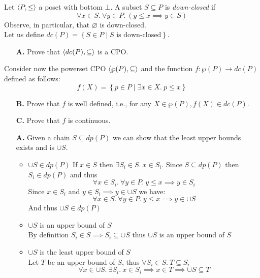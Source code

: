 \begin{exercise}{
    Let $\left< P, \leq \right>$ a poset with bottom $\bot$. A subset $S \subseteq P$ is \textit{down-closed} if
    \[ \forall x \in S.\ \forall y \in P.\ (y \leq x \implies y \in S) \]
    Observe, in particular, that $\varnothing$ is down-closed. \\
    Let us define $dc(P) = \left\{S \in P \mid S \text{ is down-closed}\right\}$.
    \begin{enumerate}
        \item[\textbf{A.}] Prove that $\left< dc(P), \subseteq \right>$ is a CPO.
    \end{enumerate}
    Consider now the powerset CPO $\left< \wp(P), \subseteq \right>$ and the function $f : \wp(P) \to dc(P)$ defined as follows:
    \[ f(X) = \left\{ p \in P \mid \exists x \in X.\ p \leq x \right\} \]
    \begin{enumerate}
        \item[\textbf{B.}] Prove that $f$ is well defined, i.e., for any $X \in \wp(P), f(X) \in dc(P)$.
        \item[\textbf{C.}] Prove that $f$ is continuous.
    \end{enumerate}
}
    \begin{enumerate}
        \item[\textbf{A.}]
            Given a chain $S \subseteq dp(P)$ we can show that the least upper bounds exists and is $\cup S$.
            \begin{itemize}
                \item $\cup S \in dp(P)$
                    If $x \in S$ then $\exists S_i \in S.\ x \in S_i$. Since $S \subseteq dp(P)$ then $S_i \in dp(P)$ and thus
                    \[ \forall x \in S_i.\ \forall y \in P.\ y \leq x \implies y \in S_i \]
                    Since $x \in S_i$ and $y \in S_i \implies y \in \cup S$ we have:
                    \[ \forall x \in S.\ \forall y \in P.\ y \leq x \implies y \in \cup S \]
                    And thus $\cup S \in dp(P)$
                \item $\cup S$ is an upper bound of $S$ \\
                    By definition $S_i \in S \implies S_i \subseteq \cup S$ thus $\cup S$ is an upper bound of $S$
                \item $\cup S$ is the least upper bound of $S$ \\
                    Let $T$ be an upper bound of $S$, thus $\forall S_i \in S.\ T \subseteq S_i$
                    \[ \forall x \in \cup S.\ \exists S_i.\ x \in S_i \implies x \in T \implies \cup S \subseteq T \]

\end{itemize}
\end{enumerate}
\end{exercise}
